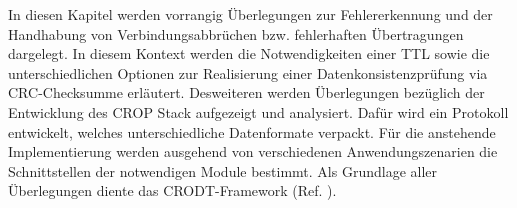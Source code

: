 \label{cap:konzept}

In diesen Kapitel werden vorrangig {\"U}berlegungen zur Fehlererkennung
und der Handhabung von Verbindungsabbr{\"u}chen bzw. fehlerhaften
{\"U}bertragungen dargelegt. In diesem Kontext werden die Notwendigkeiten einer
\gls{TTL} sowie die unterschiedlichen Optionen zur
Realisierung einer Datenkonsistenzpr{\"u}fung via CRC-Checksumme erl{\"a}utert. Desweiteren
werden {\"U}berlegungen bez{\"u}glich der Entwicklung des \gls{CROP} Stack
aufgezeigt und analysiert. Dafür wird ein Protokoll entwickelt, welches
unterschiedliche Datenformate verpackt. Für die
anstehende Implementierung werden ausgehend von verschiedenen Anwendungszenarien
die Schnittstellen der notwendigen Module bestimmt. Als Grundlage aller
{\"U}berlegungen diente das CRODT-Framework (Ref. \cite{Daher}).
